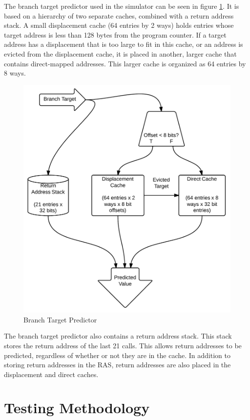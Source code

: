\documentclass[twocolumn]{article}
\newcommand{\centerimage}[3]{
\begin{figure}[ht!]  
\begin{center} #1
\caption{#2}
\label{#3}
\end{center}
\end{figure}}
\begin{document}
The branch target predictor used in the simulator can be seen in
figure \ref{btbshape}. It is based on a hierarchy of two separate
caches, combined with a return address stack. A small displacement
cache (64 entries by 2 ways) holds entries whose target address is
less than 128 bytes from the program counter. If a target address has
a displacement that is too large to fit in this cache, or an address
is evicted from the displacement cache, it is placed in another,
larger cache that contains direct-mapped addresses. This larger cache
is organized as 64 entries by 8 ways.

\centerimage{\includegraphics[width=\columnwidth]{BTB.png}}{Branch
  Target Predictor}{btbshape}

The branch target predictor also contains a return address stack. This
stack stores the return address of the last 21 calls. This allows
return addresses to be predicted, regardless of whether or not they
are in the cache. In addition to storing return addresses in the RAS,
return addresses are also placed in the displacement and direct
caches.

\section{Testing Methodology}
\end{document}
